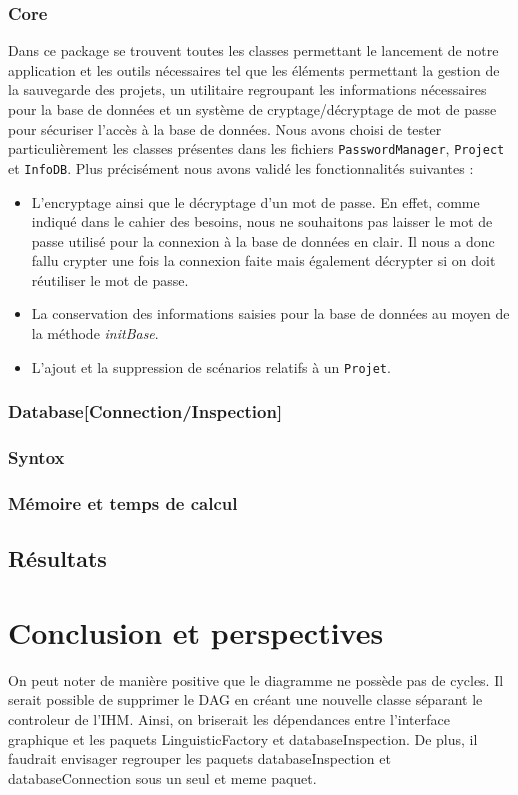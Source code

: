 \documentclass[12pt]{report}
\begin{document}
\subsection{Core}
	Dans ce package se trouvent toutes les classes permettant le lancement de notre application et les outils nécessaires tel que les éléments permettant la gestion de la sauvegarde des projets, un utilitaire regroupant les informations nécessaires pour la base de données et un système de cryptage/décryptage de mot de passe pour sécuriser l'accès à la base de données. 
Nous avons choisi de tester particulièrement les classes présentes dans les fichiers \texttt{PasswordManager}, \texttt{Project} et \texttt{InfoDB}. Plus précisément nous avons validé les fonctionnalités suivantes :
	\begin{itemize}
	\item L'encryptage ainsi que le décryptage d'un mot de passe. En effet, comme indiqué dans le cahier des besoins, nous ne souhaitons pas laisser le mot de passe utilisé pour la connexion à la base de données en clair. Il nous a donc fallu crypter une fois la connexion faite mais également décrypter si on doit réutiliser le mot de passe.
	\item La conservation des informations saisies pour la base de données au moyen de la méthode \emph{initBase}. 
	\item L'ajout et la suppression de scénarios relatifs à un \texttt{Projet}.
	\end{itemize}
	
\subsection{Database[Connection/Inspection]}
\subsection{Syntox}

\subsection{Mémoire et temps de calcul}
	
\section{Résultats}

\chapter{Conclusion et perspectives}
    On peut noter de manière positive que le diagramme ne possède pas de cycles. Il serait possible de supprimer le DAG en créant une nouvelle classe séparant le controleur de l'IHM. Ainsi, on briserait les dépendances entre l'interface graphique et les paquets LinguisticFactory et databaseInspection.
    De plus, il faudrait envisager regrouper les paquets databaseInspection et databaseConnection sous un seul et meme paquet.




\end{document}
